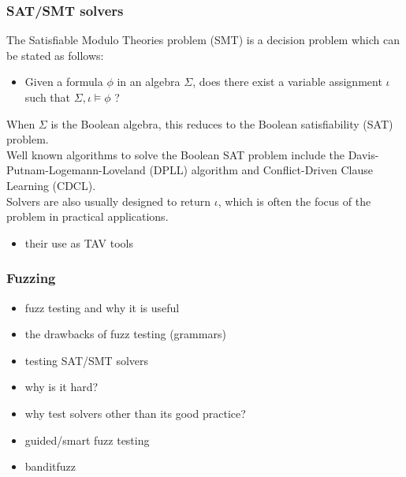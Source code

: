 \documentclass[article,11pt]{article}
\begin{document}
\subsubsection*{SAT/SMT solvers}
\label{sec:org6c9059d}
The Satisfiable Modulo Theories problem (SMT) is a decision problem which can be stated as follows\cite{notes:lec17}:\\
\begin{itemize}
\item Given a formula \(\phi\) in an algebra \(\Sigma\), does there exist a variable assignment \(\iota\) such that \(\Sigma,\iota\models \phi\) ?\\
\end{itemize}
When \(\Sigma\) is the Boolean algebra, this reduces to the Boolean satisfiability (SAT) problem.\\
Well known algorithms to solve the Boolean SAT problem include the Davis-Putnam-Logemann-Loveland (DPLL) algorithm and Conflict-Driven Clause Learning (CDCL).\\

Solvers are also usually designed to return \(\iota\), which is often the focus of the problem in practical applications.\\
\begin{itemize}
\item their use as TAV tools\\
\end{itemize}

\subsubsection*{Fuzzing}
\label{sec:org962a62b}
\begin{itemize}
\item fuzz testing and why it is useful\\
\item the drawbacks of fuzz testing (grammars)\\
\item testing SAT/SMT solvers\\
\item why is it hard?\\
\item why test solvers other than its good practice?\\
\item guided/smart fuzz testing\\
\item banditfuzz\\
\end{itemize}
\end{document}
